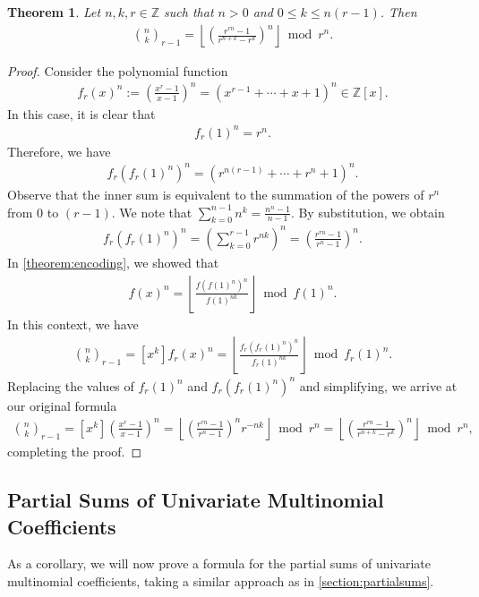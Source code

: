 \documentclass[10pt,a4paper]{article}
\theoremstyle{plain}
\newtheorem{theorem}{Theorem}[section]
\newcommand{\floor}[1]{\left\lfloor #1 \right\rfloor}
\newcommand{\Z}{\mathbb{Z}}
\begin{document}
\begin{theorem}
\label{proof:multinomialformula}
Let $n,k,r \in \mathbb{Z}$ such that $n > 0$ and $0 \leq k \leq n (r-1)$. Then
\begin{align*}
    \binom{n}{k}_{r-1} = \floor{\left(\frac{r^{rn} - 1}{r^{n+k} - r^k}\right)^n} \bmod r^n .
\end{align*}
\end{theorem}
\begin{proof}
Consider the polynomial function
\begin{align*}
    f_r(x)^n := \left(\frac{x^{r}-1}{x-1}\right)^n = (x^{r-1} + \cdots + x + 1)^n \in \Z[x].
\end{align*}
In this case, it is clear that
\begin{align*}
    f_r(1)^n = r^n .
\end{align*}
Therefore, we have
\begin{align*}
    f_r(f_r(1)^n)^n = (r^{n(r-1)} + \cdots + r^n + 1)^n .
\end{align*}
Observe that the inner sum is equivalent to the summation of the powers of $r^n$ from $0$ to $(r-1)$. We note that $\sum_{k=0}^{n-1} n^k = \frac{n^n-1}{n-1}$. By substitution, we obtain
\begin{align*}
    f_r(f_r(1)^n)^n = \left(\sum_{k=0}^{r-1} r^{nk}\right)^n = \left(\frac{r^{rn} - 1}{r^{n} - 1}\right)^n .
\end{align*}
In \cref{theorem:encoding}, we showed that
\begin{align*}
    [x^k] f(x)^{n} = \left\lfloor\frac{f(f(1)^n)^{n}}{f(1)^{n k}}\right\rfloor \bmod{f(1)^{n}} .
\end{align*}
In this context, we have
\begin{align*}
    \binom{n}{k}_{r-1} = [x^k] f_r(x)^{n} = \left\lfloor\frac{f_r(f_r(1)^n)^{n}}{f_r(1)^{n k}}\right\rfloor \bmod{f_r(1)^{n}} .
\end{align*}
Replacing the values of $f_r(1)^n$ and $f_r(f_r(1)^n)^n$ and simplifying, we arrive at our original formula
\begin{align*}
    \binom{n}{k}_{r-1} = [x^k] \left(\frac{x^{r}-1}{x-1}\right)^n
    = \left\lfloor \left(\frac{r^{rn} - 1}{r^{n} - 1}\right)^n r^{-n k}\right\rfloor \bmod r^n
    = \left\lfloor \left(\frac{r^{rn} - 1}{r^{n+k} - r^k}\right)^n\right\rfloor \bmod r^n ,
\end{align*}
completing the proof.
\end{proof}

\subsection{Partial Sums of Univariate Multinomial Coefficients}
As a corollary, we will now prove a formula for the partial sums of univariate multinomial coefficients, taking a similar approach as in \cref{section:partialsums}.
\end{document}
